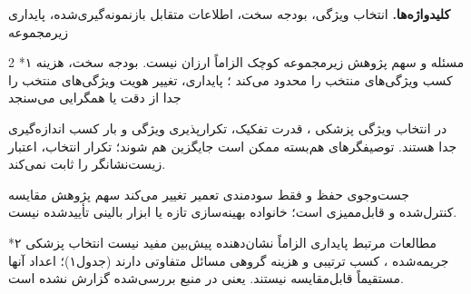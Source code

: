 \documentclass[10pt,a4paper]{article}
\makeatletter
\renewcommand{\section}{\@startsection{section}{1}{0pt}{5pt}{2pt}{\normalfont\normalsize\bfseries}}
\newcommand{\sect}[1]{\section*{#1}}
\makeatother
\begin{document}
\textbf{کلیدواژه‌ها. } انتخاب ویژگی، بودجه سخت، اطلاعات متقابل بازنمونه‌گیری‌شده، پایداری زیرمجموعه
\begin{multicols}{2}\raggedcolumns
\sect{۱  مسئله و سهم پژوهش}
زیرمجموعه کوچک الزاماً ارزان نیست. بودجه سخت، هزینه کسب ویژگی‌های منتخب را محدود می‌کند \lr{[1]}؛ پایداری، تغییر هویت ویژگی‌های منتخب را جدا از دقت یا همگرایی می‌سنجد 

در انتخاب ویژگی پزشکی \lr{[3]}، قدرت تفکیک، تکرارپذیری ویژگی و بار کسب اندازه‌گیری جدا هستند. توصیفگرهای هم‌بسته ممکن است جایگزین هم شوند؛ تکرار انتخاب، اعتبار زیست‌نشانگر را ثابت نمی‌کند.

جست‌وجوی  حفظ و فقط سودمندی تعمیر تغییر می‌کند  سهم پژوهش مقایسه کنترل‌شده و قابل‌ممیزی است؛ خانواده بهینه‌سازی تازه یا ابزار بالینی تأییدشده نیست.

\sect{۲  مطالعات مرتبط}
پایداری الزاماً نشان‌دهنده پیش‌بین مفید نیست  انتخاب پزشکی جریمه‌شده \lr{[6]}، کسب ترتیبی \lr{[7]} و هزینه گروهی \lr{[8]} مسائل متفاوتی دارند (جدول۱)؛ اعداد آنها مستقیماً قابل‌مقایسه نیستند.  یعنی در منبع بررسی‌شده گزارش نشده است.


\end{multicols}
\end{document}
